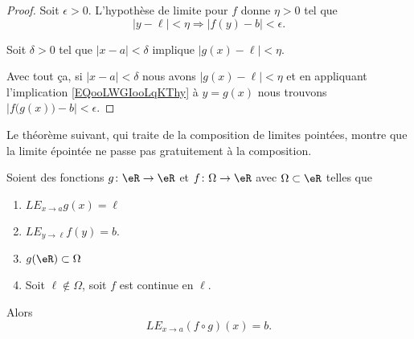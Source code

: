 \begin{proof}
	Soit \( \epsilon>0\). L'hypothèse de limite pour \( f\) donne \( \eta>0\) tel que
	\begin{equation}        \label{EQooLWGIooLqKThy}
		| y-\ell |<\eta \Rightarrow | f(y)-b |<\epsilon.
	\end{equation}

	Soit \( \delta>0\) tel que \( | x-a |<\delta\) implique \( | g(x)-\ell |<\eta\).

	Avec tout ça, si \( | x-a |<\delta\) nous avons \( | g(x)-\ell |<\eta\) et en appliquant l'implication \eqref{EQooLWGIooLqKThy} à \( y=g(x)\) nous trouvons \( | f\big( g(x) \big)-b |<\epsilon\).
\end{proof}

Le théorème suivant, qui traite de la composition de limites pointées, montre que la limite épointée ne passe pas gratuitement à la composition.
\begin{theorem}     \label{THOooNPBQooEMOYpd}
	Soient des fonctions \( g\colon \eR\to \eR\) et \( f\colon \Omega\to \eR\) avec \( \Omega\subset \eR\) telles que
	\begin{enumerate}
		\item
		      \( {LE}_{x\to a}g(x)=\ell\)
		\item
		      \( {LE}_{y\to \ell}f(y)=b\).
		\item
		      \( g(\eR)\subset \Omega\)
		\item       \label{ITEMooUNJAooCDOKcO}
		      Soit \( \ell\notin \Omega\), soit \( f\) est continue en \( \ell\).
	\end{enumerate}
	Alors
	\begin{equation}        \label{EQooTHTVooCvrFdN}
		{LE}_{x\to a}(f\circ g)(x)=b.
	\end{equation}
\end{theorem}

